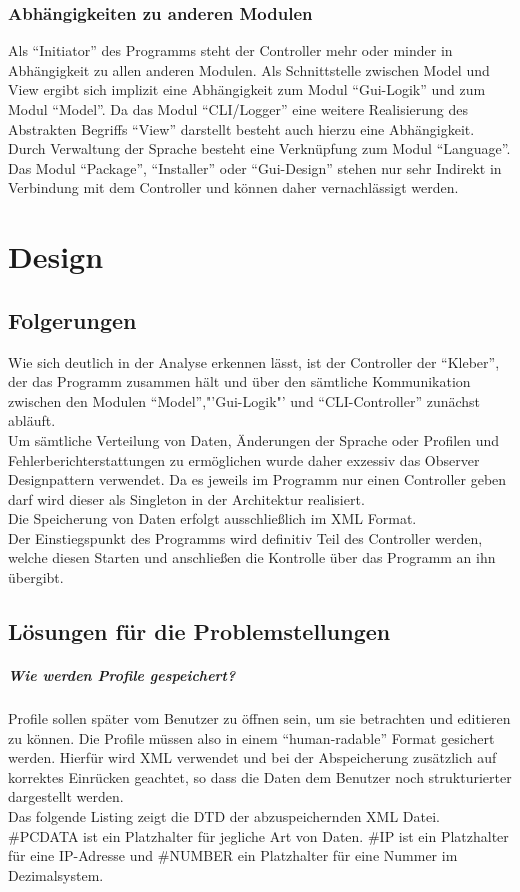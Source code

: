 \subsection{Abhängigkeiten zu anderen Modulen}
Als "`Initiator"' des Programms steht der Controller mehr oder minder in Abhängigkeit zu allen anderen Modulen.
Als Schnittstelle zwischen Model und View ergibt sich implizit eine Abhängigkeit zum Modul "`Gui-Logik"' und zum Modul "`Model"'.
Da das Modul "`CLI/Logger"' eine weitere Realisierung des Abstrakten Begriffs "`View"' darstellt besteht auch hierzu eine Abhängigkeit.\\
Durch Verwaltung der Sprache besteht eine Verknüpfung zum Modul "`Language"'. Das Modul "`Package"', "`Installer"' oder "`Gui-Design"' stehen nur sehr
Indirekt in Verbindung mit dem Controller und können daher vernachlässigt werden.

\chapter{Design}

\section{Folgerungen}
Wie sich deutlich in der Analyse erkennen lässt, ist der Controller der "`Kleber"', der das Programm zusammen hält und über den sämtliche Kommunikation zwischen den Modulen
"`Model"',"'Gui-Logik"' und "`CLI-Controller"' zunächst abläuft.\\
Um sämtliche Verteilung von Daten, Änderungen der Sprache oder Profilen und Fehlerberichterstattungen zu ermöglichen wurde daher exzessiv das Observer Designpattern verwendet.
Da es jeweils im Programm nur einen Controller geben darf wird dieser als Singleton in der Architektur realisiert.\\
Die Speicherung von Daten erfolgt ausschließlich im XML Format.\\
Der Einstiegspunkt des Programms wird definitiv Teil des Controller werden, welche diesen Starten und anschließen die Kontrolle über das Programm an ihn übergibt.

\section{Lösungen für die Problemstellungen}

  \paragraph{Wie werden Profile gespeichert?}
  Profile sollen später vom Benutzer zu öffnen sein, um sie betrachten und editieren zu können.
  Die Profile müssen also in einem "`human-radable"' Format gesichert werden. Hierfür wird XML verwendet
  und bei der Abspeicherung zusätzlich auf korrektes Einrücken geachtet, so dass die Daten dem Benutzer noch strukturierter dargestellt werden.\\
  Das folgende Listing zeigt die DTD der abzuspeichernden XML Datei. \#PCDATA ist ein Platzhalter für jegliche Art von Daten. \#IP ist ein Platzhalter für eine IP-Adresse
  und \#NUMBER ein Platzhalter für eine Nummer im Dezimalsystem.\\


